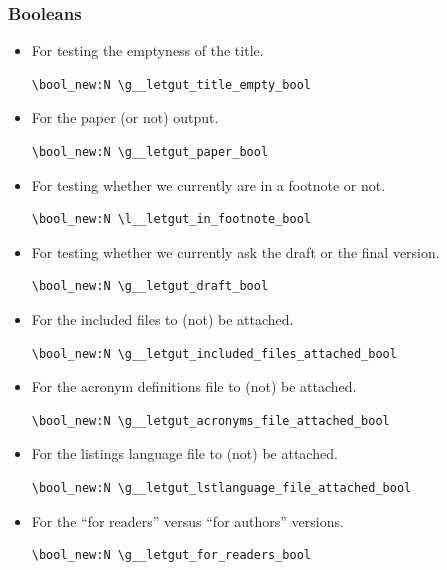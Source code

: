 \documentclass{letgut}
\begin{document}
\subsubsection{Booleans}
\label{ImplementationDeclarationsBooleans-s09g55h0jlj0}
\begin{itemize}
\item For testing the emptyness of the title.
\begin{lstlisting}
\bool_new:N \g__letgut_title_empty_bool
\end{lstlisting}
\item For the paper (or not) output.
\begin{lstlisting}
\bool_new:N \g__letgut_paper_bool
\end{lstlisting}
\item For testing whether we currently are in a footnote or not.
\begin{lstlisting}
\bool_new:N \l__letgut_in_footnote_bool
\end{lstlisting}
\item For testing whether we currently ask the draft or the final version.
\begin{lstlisting}
\bool_new:N \g__letgut_draft_bool
\end{lstlisting}
\item For the included files to (not) be attached.
\begin{lstlisting}
\bool_new:N \g__letgut_included_files_attached_bool
\end{lstlisting}
\item For the acronym definitions file to (not) be attached.
\begin{lstlisting}
\bool_new:N \g__letgut_acronyms_file_attached_bool
\end{lstlisting}
\item For the listings language file to (not) be attached.
\begin{lstlisting}
\bool_new:N \g__letgut_lstlanguage_file_attached_bool
\end{lstlisting}
\item For the “for readers” versus “for authors” versions.
\begin{lstlisting}
\bool_new:N \g__letgut_for_readers_bool
\end{lstlisting}
\end{itemize}
\end{document}
